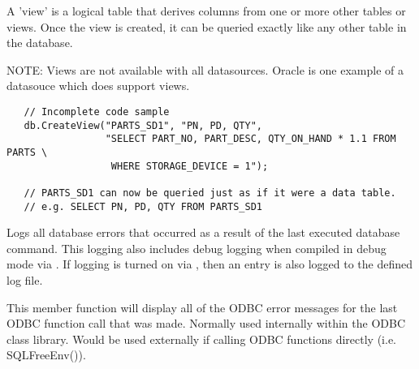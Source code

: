 

A 'view' is a logical table that derives columns from one or more other tables or views.  Once the view is created, it can be queried exactly like any other table in the database.

NOTE: Views are not available with all datasources.  Oracle is one example of a datasouce which does support views.


\begin{verbatim}
   // Incomplete code sample
   db.CreateView("PARTS_SD1", "PN, PD, QTY",  
                 "SELECT PART_NO, PART_DESC, QTY_ON_HAND * 1.1 FROM PARTS \
                  WHERE STORAGE_DEVICE = 1");

   // PARTS_SD1 can now be queried just as if it were a data table.
   // e.g. SELECT PN, PD, QTY FROM PARTS_SD1
\end{verbatim}


\label{wxdbdispallerrors}


Logs all database errors that occurred as a result of the last executed database command.  This logging also includes debug logging when compiled in debug mode via .  If logging is turned on via , then an entry is also logged to the defined log file.






This member function will display all of the ODBC error messages for the last ODBC function call that was made.  Normally used internally within the ODBC class library.  Would be used externally if calling ODBC functions directly (i.e. SQLFreeEnv()).

